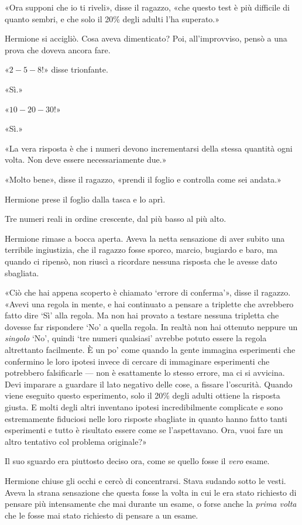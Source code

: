 «Ora supponi che io ti riveli», disse il ragazzo, «che questo test è più difficile di quanto sembri, e che solo il 20\% degli adulti l’ha superato.»

Hermione si accigliò. Cosa aveva dimenticato? Poi, all’improvviso, pensò a una prova che doveva ancora fare.

«$2-5-8$!» disse trionfante.

«Sì.»

«$10-20-30$!»

«Sì.»

«La vera risposta è che i numeri devono incrementarsi della stessa quantità ogni volta. Non deve essere necessariamente due.»

«Molto bene», disse il ragazzo, «prendi il foglio e controlla come sei andata.»

Hermione prese il foglio dalla tasca e lo aprì.

Tre numeri reali in ordine crescente, dal più basso al più alto.

Hermione rimase a bocca aperta. Aveva la netta sensazione di aver subito una terribile ingiustizia, che il ragazzo fosse sporco, marcio, bugiardo e baro, ma quando ci ripensò, non riuscì a ricordare nessuna risposta che le avesse dato sbagliata.

«Ciò che hai appena scoperto è chiamato ‘errore di conferma’», disse il ragazzo. «Avevi una regola in mente, e hai continuato a pensare a triplette che avrebbero fatto dire ‘Sì’ alla regola. Ma non hai provato a testare nessuna tripletta che dovesse far rispondere ‘No’ a quella regola. In realtà non hai ottenuto neppure un \textit{singolo} ‘No’, quindi ‘tre numeri qualsiasi’ avrebbe potuto essere la regola altrettanto facilmente. È un po’ come quando la gente immagina esperimenti che confermino le loro ipotesi invece di cercare di immaginare esperimenti che potrebbero falsificarle — non è esattamente lo stesso errore, ma ci si avvicina. Devi imparare a guardare il lato negativo delle cose, a fissare l’oscurità. Quando viene eseguito questo esperimento, solo il 20\% degli adulti ottiene la risposta giusta. E molti degli altri inventano ipotesi incredibilmente complicate e sono estremamente fiduciosi nelle loro risposte sbagliate in quanto hanno fatto tanti esperimenti e tutto è risultato essere come se l’aspettavano. Ora, vuoi fare un altro tentativo col problema originale?»

Il suo sguardo era piuttosto deciso ora, come se quello fosse il \textit{vero} esame.

Hermione chiuse gli occhi e cercò di concentrarsi. Stava sudando sotto le vesti. Aveva la strana sensazione che questa fosse la volta in cui le era stato richiesto di pensare più intensamente che mai durante un esame, o forse anche la \textit{prima volta} che le fosse mai stato richiesto di pensare a un esame.

